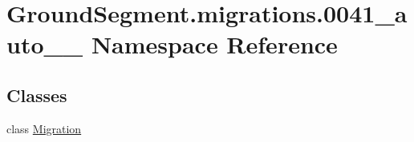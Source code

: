 \hypertarget{namespace_ground_segment_1_1migrations_1_10041__auto__20170131__2030}{}\section{Ground\+Segment.\+migrations.0041\+\_\+auto\+\_\+\_ Namespace Reference}
\label{namespace_ground_segment_1_1migrations_1_10041__auto__20170131__2030}
\subsection*{Classes}
\begin{DoxyCompactItemize}
\item 
class \hyperlink{class_ground_segment_1_1migrations_1_10041__auto__20170131__2030_1_1_migration}{Migration}
\end{DoxyCompactItemize}

